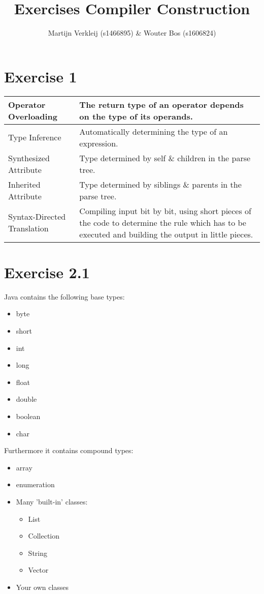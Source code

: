 \documentclass[11pt]{article} %
\title{Exercises Compiler Construction}
\author{Martijn Verkleij (s1466895) \& Wouter Bos (s1606824)}
\begin{document}
\maketitle

\section*{Exercise 1}
\begin{tabular}{|l|p{10cm}|}\hline
Operator Overloading
& The return type of an operator depends on the type of its operands. \\\hline

Type Inference
& Automatically determining the type of an expression. \\\hline

Synthesized Attribute
& Type determined by self \& children in the parse tree. \\\hline

Inherited Attribute
& Type determined by siblings \& parents in the parse tree. \\\hline

Syntax-Directed Translation
& Compiling input bit by bit, using short pieces of the code to determine the rule which has to be executed and building the output in little pieces. \\\hline

\end{tabular}


\section*{Exercise 2.1}
Java contains the following base types:
\begin{itemize}
\item byte
\item short
\item int
\item long
\item float
\item double
\item boolean
\item char
\end{itemize}
Furthermore it contains compound types:

\begin{itemize}
\item array
\item enumeration
\item Many 'built-in' classes:
\begin{itemize}
\item List
\item Collection
\item String
\item Vector
\end{itemize}
\item Your own classes
\end{itemize}
\end{document}
